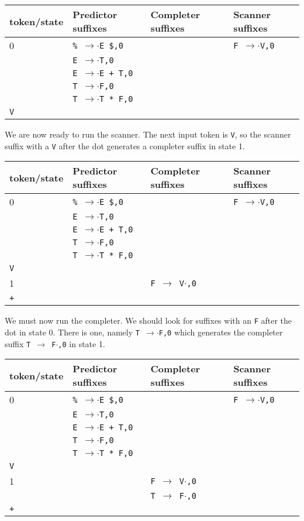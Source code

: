 \documentclass[11pt]{article}
\def\ra{\rightarrow}
\begin{document}
\begin{tabular}{|l|l|l|l|}
\hline
token/state & Predictor suffixes & Completer suffixes & Scanner suffixes\\
\hline
0     & \texttt{\% $\ra$$\cdot$E \$,0} & & \texttt{F $\ra$$\cdot$V,0}\\
      & \texttt{E $\ra$$\cdot$T,0} & & \\
      & \texttt{E $\ra$$\cdot$E + T,0} & & \\
      & \texttt{T $\ra$$\cdot$F,0} & & \\
      & \texttt{T $\ra$$\cdot$T * F,0} & & \\
\hline
\texttt{V}     &  & &\\
\hline
\end{tabular}

We are now ready to run the scanner.  The next input token is
\texttt{V}, so the scanner suffix with a \texttt{V} after the dot
generates a completer suffix in state 1. 

\begin{tabular}{|l|l|l|l|}
\hline
token/state & Predictor suffixes & Completer suffixes & Scanner suffixes\\
\hline
 0    & \texttt{\% $\ra$$\cdot$E \$,0} & & \texttt{F $\ra$$\cdot$V,0}\\
      & \texttt{E $\ra$$\cdot$T,0} & & \\
      & \texttt{E $\ra$$\cdot$E + T,0} & & \\
      & \texttt{T $\ra$$\cdot$F,0} & & \\
      & \texttt{T $\ra$$\cdot$T * F,0} & & \\
\hline
\texttt{V}     &  & &\\
\hline
1     &  &  \texttt{F $\ra$ V$\cdot$,0}& \\
\hline
\texttt{+} &  & &\\
\hline
\end{tabular}

We must now run the completer.  We should look for suffixes with an
\texttt{F} after the dot in state 0.  There is one, namely \texttt{T
$\ra$$\cdot$F,0} which generates the completer suffix \texttt{T $\ra$
F$\cdot$,0} in state 1.

\begin{tabular}{|l|l|l|l|}
\hline
token/state & Predictor suffixes & Completer suffixes & Scanner suffixes\\
\hline
0     & \texttt{\% $\ra$$\cdot$E \$,0} & & \texttt{F $\ra$$\cdot$V,0}\\
      & \texttt{E $\ra$$\cdot$T,0} & & \\
      & \texttt{E $\ra$$\cdot$E + T,0} & & \\
      & \texttt{T $\ra$$\cdot$F,0} & & \\
      & \texttt{T $\ra$$\cdot$T * F,0} & & \\
\hline
\texttt{V} &  & &\\
\hline
1     &  & \texttt{F $\ra$ V$\cdot$,0}& \\
      &  & \texttt{T $\ra$ F$\cdot$,0}& \\
\hline
\texttt{+} &  & &\\
\hline
\end{tabular}
\end{document}
